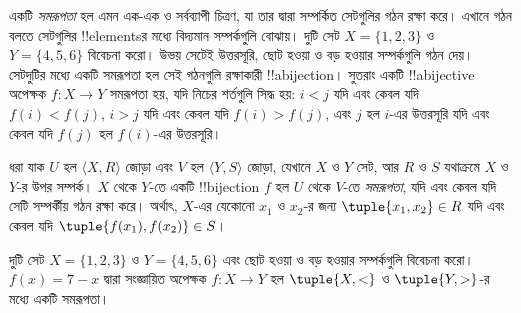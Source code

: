 \documentclass[../../../include/open-logic-section]{subfiles}
\begin{document}

\begin{explain}
একটি \emph{সমরূপতা} হল এমন এক-এক ও সর্বব্যাপী চিত্রণ, যা তার দ্বারা
সম্পর্কিত সেটগুলির গঠন রক্ষা করে। এখানে গঠন বলতে সেটগুলির
!!{element}sর মধ্যে বিদ্যমান সম্পর্কগুলি বোঝায়।
দুটি সেট $X=\{1,2,3\}$ ও $Y=\{4,5,6\}$ বিবেচনা করো।
উভয় সেটেই উত্তরসূরি, ছোট হওয়া ও বড় হওয়ার সম্পর্কগুলি গঠন দেয়।
সেটদুটির মধ্যে একটি সমরূপতা হল সেই গঠনগুলি রক্ষাকারী !!a{bijection}।
সুতরাং একটি !!a{bijective} অপেক্ষক $f \colon X \to Y$
সমরূপতা হয়, যদি নিচের শর্তগুলি সিদ্ধ হয়: $i<j$ যদি এবং কেবল যদি $f(i)<f(j)$,
$i>j$ যদি এবং কেবল যদি $f(i)>f(j)$, এবং
$j$ হল $i$-এর উত্তরসূরি যদি এবং কেবল যদি $f(j)$ হল
$f(i)$-এর উত্তরসূরি।
\end{explain}

\begin{defn}[সমরূপতা]
ধরা যাক $U$ হল $\langle X, R\rangle$ জোড়া এবং
$V$ হল $\langle Y, S\rangle$ জোড়া, যেখানে $X$ ও $Y$ সেট,
আর $R$ ও $S$ যথাক্রমে $X$ ও $Y$-র উপর সম্পর্ক।
$X$ থেকে $Y$-তে একটি !!{bijection} $f$ হল $U$ থেকে $V$-তে
\emph{সমরূপতা}, যদি এবং কেবল যদি সেটি সম্পর্কীয় গঠন রক্ষা করে।
অর্থাৎ, $X$-এর যেকোনো $x_{1}$ ও $x_{2}$-র জন্য
$\tuple{x_1,x_2} \in R$ যদি এবং কেবল যদি
$\tuple{f(x_1),f(x_2)} \in S$।
\end{defn}

\begin{ex}
দুটি সেট $X=\{1,2,3\}$ ও $Y=\{4,5,6\}$ এবং ছোট হওয়া ও
বড় হওয়ার সম্পর্কগুলি বিবেচনা করো। $f(x) = 7-x$ দ্বারা সংজ্ঞায়িত
অপেক্ষক $f\colon X \to Y$ হল $\tuple{X,<}$ ও $\tuple{Y,>}$-র
মধ্যে একটি সমরূপতা।
\end{ex}
\end{document}
